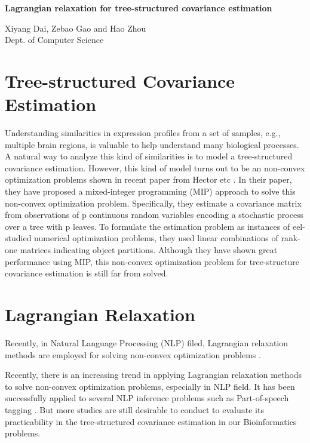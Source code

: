 \documentclass[11pt, reqno]{amsart}
\begin{document}
\begin{center}
\textbf{Lagrangian relaxation for tree-structured covariance estimation}
\newline
\end{center}
\begin{flushright}
Xiyang Dai, Zebao Gao and Hao Zhou\\
Dept. of Computer Science
\end{flushright}

\section{Tree-structured Covariance Estimation}
Understanding similarities in expression profiles from a set of samples, e.g., multiple brain regions, is valuable to help understand many biological processes. A natural way to analyze this kind of similarities is to model a tree-structured covariance estimation. However, this kind of model turns out to be an non-convex optimization problems shown in recent paper from Hector etc \cite{Hector09}. In their paper, they have proposed a mixed-integer programming (MIP) approach to solve this non-convex optimization problem. 
Specifically, they estimate a covariance matrix from observations of p continuous random variables encoding a stochastic process over a tree with p leaves. To formulate the estimation problem as instances of eel-studied numerical optimization problems, they used linear combinations of rank-one matrices indicating object partitions. Although they have shown great performance using MIP, this non-convex optimization problem for tree-structure covariance estimation is still far from solved.

\section{Lagrangian Relaxation}
Recently, in Natural Language Processing (NLP) filed, Lagrangian relaxation methods are employed for solving non-convex optimization problems .

Recently, there is an increasing trend in applying Lagrangian relaxation methods to solve non-convex optimization problems, especially in NLP field. It has been successfully applied to several NLP inference problems such as Part-of-speech tagging \cite{Lagrangian}. But more studies are still desirable to conduct to evaluate its practicability in the tree-structured covariance estimation in our Bioinformatics problems.
\end{document}
